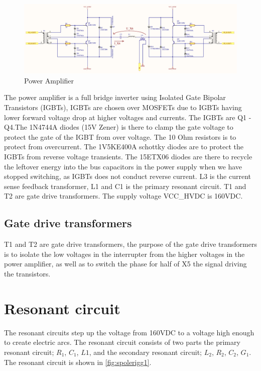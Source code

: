\begin{figure}[h!]
    \centering
    \includegraphics[width=0.9\textheight,angle=-90]{Skjema/TK531_Utgangstrinn_r.pdf}
    \caption{Power Amplifier}
    \label{fig:tk531}
\end{figure}

The power amplifier is a full bridge inverter using Isolated Gate Bipolar Transistors (IGBTs), IGBTs are chosen over MOSFETs due to IGBTs having lower forward voltage drop at higher voltages and currents. The IGBTs are Q1 - Q4.The 1N4744A diodes (15V Zener) is there to clamp the gate voltage to protect the gate of the IGBT from over voltage. The 10 Ohm resistors is to protect from overcurrent. The 1V5KE400A schottky diodes are to protect the IGBTs from reverse voltage transients. The 15ETX06 diodes are there to recycle the leftover energy into the bus capacitors in the power supply when we have stopped switching, as IGBTs does not conduct reverse current. L3 is the current sense feedback transformer, L1 and C1 is the primary resonant circuit. T1 and T2 are gate drive transformers. The supply voltage VCC\_HVDC is 160VDC.

\subsection{Gate drive transformers}
T1 and T2 are gate drive transformers, the purpose of the gate drive transformers is to isolate the low voltages in the interrupter from the higher voltages in the power amplifier, as well as to switch the phase for half of X5 the signal driving the transistors.


\newpage
\section{Resonant circuit}
\label{sec:resonant}

The resonant circuits step up the voltage from 160VDC to a voltage high enough to create electric arcs. The resonant circuit consists of two parts the primary resonant circuit; $R_1$, $C_1$, $L1$, and the secondary resonant circuit; $L_2$, $R_2$, $C_2$, $G_1$. The resonant circuit is shown in \cref{fig:spolerigg1}.

